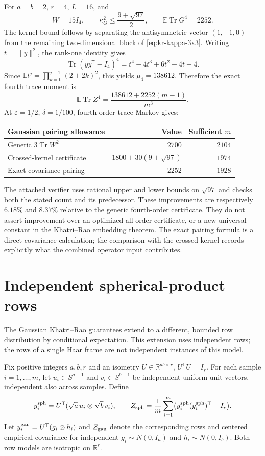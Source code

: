 \documentclass[11pt,a4paper]{article}
\theoremstyle{definition}\newtheorem{definition}[theorem]{Definition}
\theoremstyle{remark}\newtheorem{remark}[theorem]{Remark}
\numberwithin{equation}{section}
\begin{document}
For $a=b=2$, $r=4$, $L=16$, and
\[
 W=15I_4,\qquad
 \kappa_G^2\le\frac{9+\sqrt{97}}2,\qquad
 \mathbb E\operatorname{Tr}G^4=2252.
\]
The kernel bound follows by separating the antisymmetric vector $(1,-1,0)$
from the remaining two-dimensional block of \eqref{eq:kr-kappa-3x3}.
Writing $t=\|y\|^2$, the rank-one identity gives
\[
 \operatorname{Tr}(yy^{\mathsf T}-I_4)^4=t^4-4t^3+6t^2-4t+4.
\]
Since $\mathbb Et^j=\prod_{k=0}^{j-1}(2+2k)^2$, this yields
$\mu_4=138612$. Therefore the exact fourth trace moment is
\begin{equation}\label{eq:kr-product-exact-fourth}
 \mathbb E\operatorname{Tr}Z^4
 =\frac{138612+2252(m-1)}{m^3}.
\end{equation}
At $\varepsilon=1/2$, $\delta=1/100$, fourth-order trace Markov gives:
\begin{center}
\begin{tabular}{lrr}
\toprule
Gaussian pairing allowance & Value & Sufficient $m$\\
\midrule
Generic $3\operatorname{Tr}W^2$ & $2700$ & $2104$\\
Crossed-kernel certificate & $1800+30(9+\sqrt{97})$ & $1974$\\
Exact covariance pairing & $2252$ & $1928$\\
\bottomrule
\end{tabular}
\end{center}
The attached verifier uses rational upper and lower bounds on $\sqrt{97}$
and checks both the stated count and its predecessor. These improvements
are respectively $6.18\%$ and $8.37\%$ relative to the generic fourth-order
certificate. They do not assert improvement over an optimized all-order
certificate, or a new universal constant in the Khatri--Rao embedding theorem.
The exact pairing formula is a direct covariance calculation; the comparison
with the crossed kernel records explicitly what the combined operator input
contributes.


\section{Independent spherical-product rows}
\label{sec:spherical-product}

The Gaussian Khatri--Rao guarantees extend to a different, bounded row
distribution by conditional expectation.  This extension uses independent
rows; the rows of a single Haar frame are not independent instances of this
model.

Fix positive integers $a,b,r$ and an isometry
$U\in\mathbb R^{ab\times r}$, $U^{\mathsf T}U=I_r$.  For each sample
$i=1,\ldots,m$, let $u_i\in S^{a-1}$ and $v_i\in S^{b-1}$ be independent
uniform unit vectors, independent also across samples.  Define
\[
 y_i^{\rm sph}=U^{\mathsf T}(\sqrt a\,u_i\otimes\sqrt b\,v_i),
 \qquad
 Z_{\rm sph}=\frac1m\sum_{i=1}^m
       \bigl(y_i^{\rm sph}(y_i^{\rm sph})^{\mathsf T}-I_r\bigr).
\]
Let $y_i^{\rm gau}=U^{\mathsf T}(g_i\otimes h_i)$ and $Z_{\rm gau}$
denote the corresponding rows and centered empirical covariance for
independent $g_i\sim N(0,I_a)$ and $h_i\sim N(0,I_b)$.  Both row models
are isotropic on $\mathbb R^r$.
\end{document}
